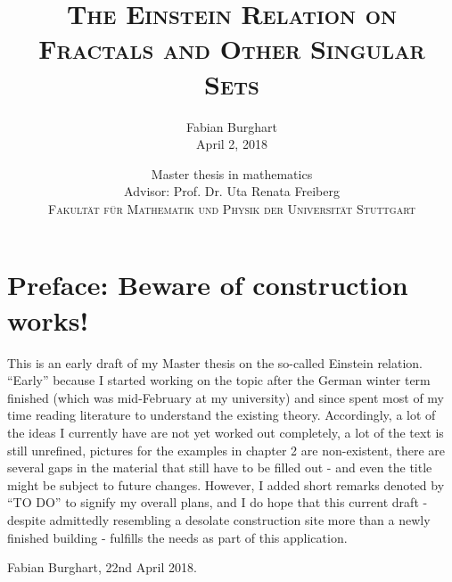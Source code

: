\documentclass[a4paper,11pt,twoside,notitlepage]{report}
\title{$\ $\\ \textsc{The Einstein Relation on Fractals and Other Singular Sets}\\$\ $}
\author{{\Large {Fabian Burghart}}\\[1em]
  {\large April 2, 2018}\\[10em]}
\date{{\large Master thesis in mathematics}\\
  {\large Advisor: Prof. Dr. Uta Renata Freiberg}\\[7em]
  {\large \textsc{Fakult{\"a}t f{\"u}r Mathematik und Physik der Universit{\"a}t Stuttgart}}}
\begin{document}
\maketitle
\thispagestyle{empty}
\newpage

\thispagestyle{empty}

\section*{Preface: Beware of construction works!}

This is an early draft of my Master thesis on the so-called Einstein relation. ``Early'' because I started working on the topic after the German winter term finished (which was mid-February at my university) and since spent most of my time reading literature to understand the existing theory. Accordingly, a lot of the ideas I currently have are not yet worked out completely, a lot of the text is still unrefined, pictures for the examples in chapter 2 are non-existent, there are several gaps in the material that still have to be filled out - and even the title might be subject to future changes. However, I added short remarks denoted by ``TO DO'' to signify my overall plans, and I do hope that this current draft - despite admittedly resembling a desolate construction site more than a newly finished building - fulfills the needs as part of this application.

\begin{flushright}
  Fabian Burghart, 22nd April 2018. 
\end{flushright}


\tableofcontents









\nocite{*}   %

\printbibliography
{}
\end{document}
